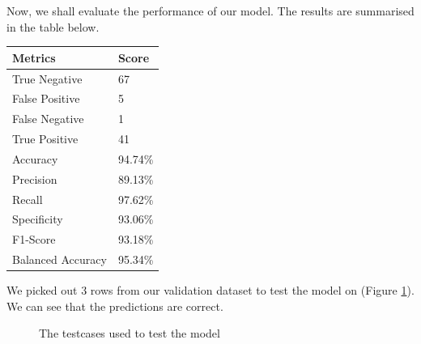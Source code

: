 Now, we shall evaluate the performance of our model. The results are summarised in the table below.

\begin{center}
	\begin{tabular}{ | m{4cm} | m{2cm} | } 
		\hline
		Metrics & Score \\ 
		\hline
		True Negative & 67 \\
		\hline
		False Positive & 5 \\
		\hline
		False Negative & 1 \\
		\hline
		True Positive & 41 \\
		\hline
		Accuracy & 94.74\% \\
		\hline
		Precision & 89.13\% \\
		\hline 
		Recall & 97.62\% \\
		\hline 
		Specificity & 93.06\% \\
		\hline 
		F1-Score & 93.18\% \\
		\hline
		Balanced Accuracy & 95.34\% \\
		\hline 
	\end{tabular}
\end{center}

 We picked out 3 rows from our validation dataset to test the model on (Figure  \ref{fig:testcases}). We can see that the predictions are correct.
\begin{figure}[h]
	\vspace{-.5cm}
	\caption{The testcases used to test the model}
	\label{fig:testcases}
	\vspace{-.5cm}
\end{figure}

